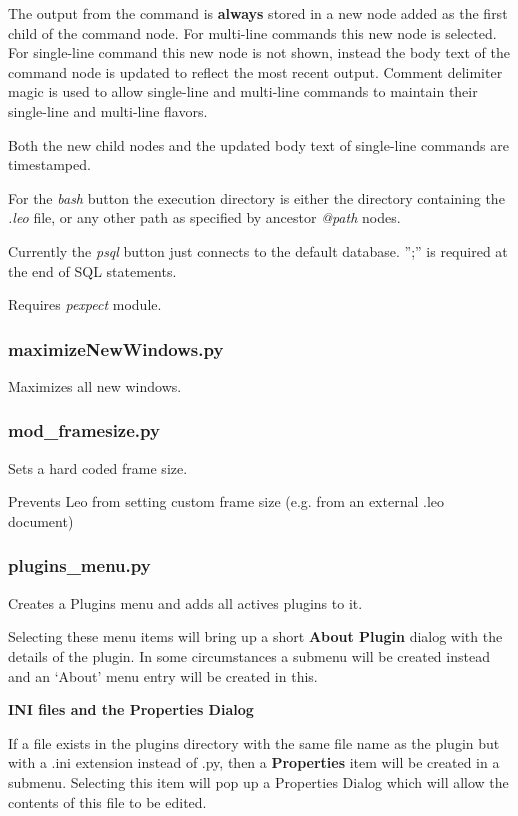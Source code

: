 \documentclass[a4paper,10pt,english]{sphinxmanual}
\begin{document}
The output from the command is \textbf{always} stored in a new node added
as the first child of the command node.  For multi-line commands
this new node is selected.  For single-line command this new node
is not shown, instead the body text of the command node is updated
to reflect the most recent output.  Comment delimiter magic is used
to allow single-line and multi-line commands to maintain their
single-line and multi-line flavors.

Both the new child nodes and the updated body text of single-line
commands are timestamped.

For the \emph{bash} button the execution directory is either the directory
containing the \emph{.leo} file, or any other path as specified by ancestor
\emph{@path} nodes.

Currently the \emph{psql} button just connects to the default database.  '';''
is required at the end of SQL statements.

Requires \emph{pexpect} module.


\subsubsection{maximizeNewWindows.py}
\label{plugins:maximizenewwindows-py}
Maximizes all new windows.


\subsubsection{mod\_framesize.py}
\label{plugins:mod-framesize-py}
Sets a hard coded frame size.

Prevents Leo from setting custom frame size (e.g. from an external .leo
document)


\subsubsection{plugins\_menu.py}
\label{plugins:plugins-menu-py}
Creates a Plugins menu and adds all actives plugins to it.

Selecting these menu items will bring up a short \textbf{About Plugin} dialog
with the details of the plugin. In some circumstances a submenu will be created
instead and an `About' menu entry will be created in this.

\textbf{INI files and the Properties Dialog}

If a file exists in the plugins directory with the same file name as the plugin
but with a .ini extension instead of .py, then a \textbf{Properties} item will be
created in a submenu. Selecting this item will pop up a Properties Dialog which
will allow the contents of this file to be edited.
\end{document}
